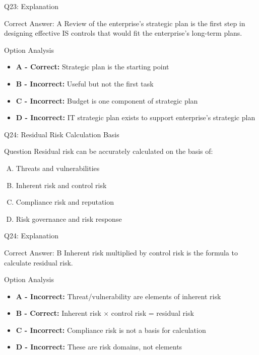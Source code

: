\documentclass{beamer}
\begin{document}
	\begin{frame}{Q23: Explanation}
		\begin{block}{Correct Answer: A}
			Review of the enterprise's strategic plan is the first step in designing effective IS controls that would fit the enterprise's long-term plans.
		\end{block}
		\begin{block}{Option Analysis}
			\begin{itemize}
				\item \textbf{A - Correct:} Strategic plan is the starting point
				\item \textbf{B - Incorrect:} Useful but not the first task
				\item \textbf{C - Incorrect:} Budget is one component of strategic plan
				\item \textbf{D - Incorrect:} IT strategic plan exists to support enterprise's strategic plan
			\end{itemize}
		\end{block}
	\end{frame}
	
	\begin{frame}{Q24: Residual Risk Calculation Basis}
		\begin{block}{Question}
			Residual risk can be accurately calculated on the basis of:
		\end{block}
		\begin{enumerate}[(A)]
			\item Threats and vulnerabilities
			\item Inherent risk and control risk
			\item Compliance risk and reputation
			\item Risk governance and risk response
		\end{enumerate}
	\end{frame}
	
	\begin{frame}{Q24: Explanation}
		\begin{block}{Correct Answer: B}
			Inherent risk multiplied by control risk is the formula to calculate residual risk.
		\end{block}
		\begin{block}{Option Analysis}
			\begin{itemize}
				\item \textbf{A - Incorrect:} Threat/vulnerability are elements of inherent risk
				\item \textbf{B - Correct:} Inherent risk × control risk = residual risk
				\item \textbf{C - Incorrect:} Compliance risk is not a basis for calculation
				\item \textbf{D - Incorrect:} These are risk domains, not elements
			\end{itemize}
		\end{block}
	\end{frame}
	
\end{document}
